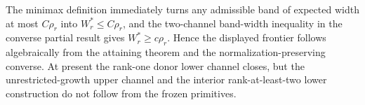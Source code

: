 The minimax definition immediately turns any admissible band of expected width at most \(C\rho_r\) into \(W_r^*\le C\rho_r\), and the two-channel band-width inequality in the converse partial result gives \(W_r^*\ge c\rho_r\).  Hence the displayed frontier follows algebraically from the attaining theorem and the normalization-preserving converse.  At present the rank-one donor lower channel closes, but the unrestricted-growth upper channel and the interior rank-at-least-two lower construction do not follow from the frozen primitives.